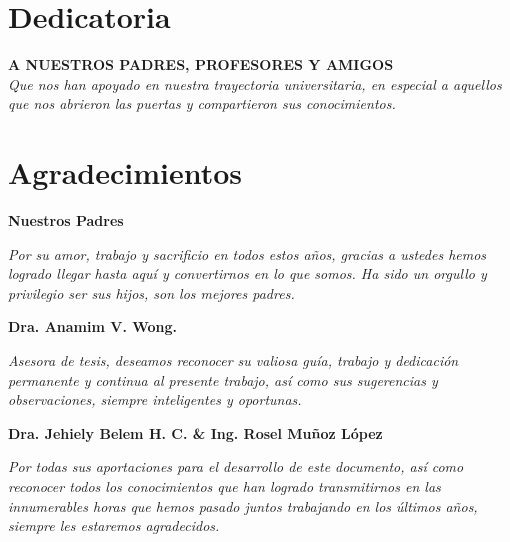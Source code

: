 
\chapter*{Dedicatoria}
\thispagestyle{empty}

	\begin{flushright}
	\vfill
	\textbf{A NUESTROS PADRES, PROFESORES Y AMIGOS}\\
	\textit{Que nos han apoyado en nuestra trayectoria universitaria, en especial a aquellos\\ que nos abrieron las puertas y compartieron sus conocimientos.}
	\vfill
\end{flushright}

\chapter*{Agradecimientos}
\thispagestyle{empty}
\vfill
{\flushright \textbf{Nuestros Padres}\\}

\textit{Por su amor, trabajo y sacrificio en todos estos años, gracias a ustedes hemos logrado llegar hasta aquí y convertirnos en lo que somos. Ha sido un orgullo y privilegio ser sus hijos, son los mejores padres.}
\newline

{\flushright \textbf{Dra. Anamim V. Wong.\\}}

\textit{Asesora de tesis, deseamos reconocer su valiosa guía, trabajo y dedicación permanente y continua al presente trabajo, así como sus sugerencias y observaciones, siempre inteligentes y oportunas.}
\newline

{\flushright \textbf{Dra. Jehiely Belem H. C.  \& Ing. Rosel Muñoz López}\\}

\textit{Por todas sus aportaciones para el desarrollo de este documento, así como reconocer todos los conocimientos que han logrado transmitirnos en las innumerables horas que hemos pasado juntos trabajando en los últimos años, siempre les estaremos agradecidos.}
\newline
\vfill







